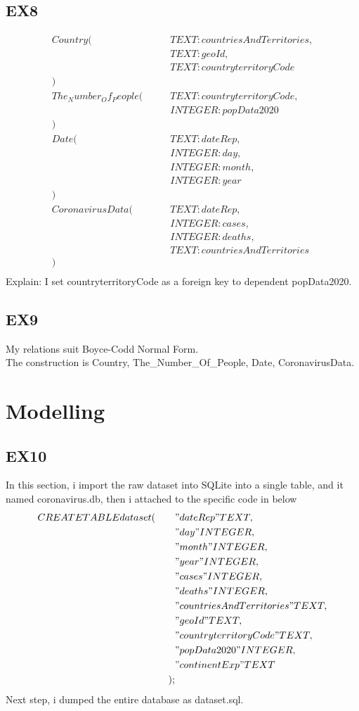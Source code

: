\documentclass[]{article}
\begin{document}
\begin{titlepage}
		    \subsection{EX8}
		        \begin{align}
		    Country(\qquad&TEXT: countriesAndTerritories,\\&TEXT: geoId, \\&TEXT: countryterritoryCode\\)\\
		    The_Number_Of_People(\qquad&TEXT: countryterritoryCode, \\&INTEGER: popData2020\\)\\
		    Date(\qquad&TEXT: dateRep,\\ &INTEGER: day,\\&INTEGER: month,\\&INTEGER: year\\)\\
		    CoronavirusData(\qquad&TEXT: dateRep,\\&INTEGER: cases,\\&INTEGER: deaths,\\&TEXT: countriesAndTerritories\\)\\
		        \end{align}
		    Explain: I set countryterritoryCode as a foreign key to dependent popData2020.
		    \subsection{EX9}
            My relations suit Boyce-Codd Normal Form.\\
            The construction is Country, The_Number_Of_People, Date, CoronavirusData.
		\section{Modelling}
		    \subsection{EX10}
		    In this section, i import the raw dataset into SQLite into a single table, and it named coronavirus.db, then i attached to the specific code in below\\
		        \begin{align}
		    CREATE TABLE dataset (\qquad&"dateRep" TEXT,\\&"day" INTEGER, \\&"month" INTEGER, \\&"year" INTEGER,\\&"cases" INTEGER, \\&"deaths" INTEGER,\\&"countriesAndTerritories" TEXT, \\&"geoId" TEXT, \\&"countryterritoryCode" TEXT, \\&"popData2020" INTEGER, \\&"continentExp" TEXT\\);\\
		        \end{align}
		    Next step, i dumped the entire database as dataset.sql.

\end{titlepage}
\end{document}

